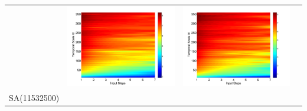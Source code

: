 \documentclass[draft,wrr]{AGUTeX}
\begin{document}
\begin{article}
\begin{table}[H]
\begin{tabular}{cccc}
&\begin{minipage}{.3\textwidth}\includegraphics[width=\linewidth]{resultgraph/05585000pep_abs.png}\end{minipage}
&\begin{minipage}{.3\textwidth}\includegraphics[width=\linewidth]{resultgraph/05585000pepq_abs.png}\end{minipage}
\\
SA(11532500)

\end{tabular}
\end{table}
\end{article}
\end{document}
